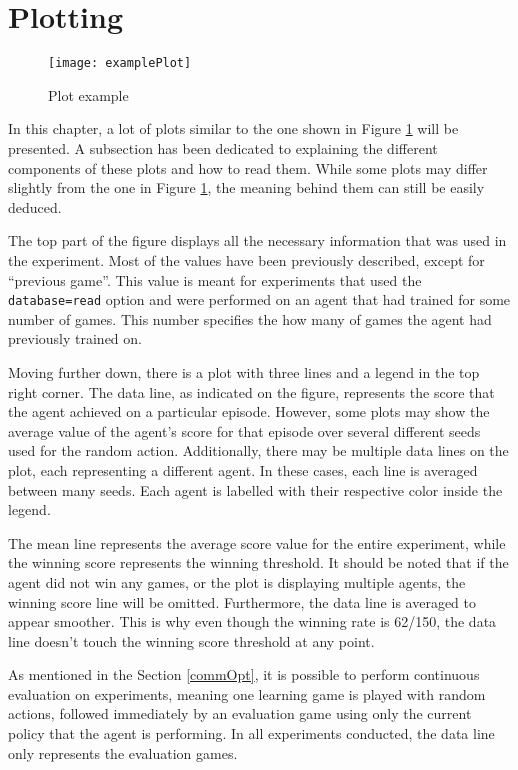 \section{Plotting}

\begin{figure}[h]
    \centering
    \texttt{[image: examplePlot]}
    \caption{Plot example}
    \label{fig:plt_eg}
\end{figure}

In this chapter, a lot of plots similar to the one shown in Figure \ref{fig:plt_eg} will be presented. A subsection has been dedicated to explaining the different components of these plots and how to read them. While some plots may differ slightly from the one in Figure \ref{fig:plt_eg}, the meaning behind them can still be easily deduced.

The top part of the figure displays all the necessary information that was used in the experiment. Most of the values have been previously described, except for ``previous game''. This value is meant for experiments that used the \texttt{database=read} option and were performed on an agent that had trained for some number of games. This number specifies the how many of games the agent had previously trained on.

Moving further down, there is a plot with three lines and a legend in the top right corner. The data line, as indicated on the figure, represents the score that the agent achieved on a particular episode. However, some plots may show the average value of the agent's score for that episode over several different seeds used for the random action. Additionally, there may be multiple data lines on the plot, each representing a different agent. In these cases, each line is averaged between many seeds. Each agent is labelled with their respective color inside the legend.

The mean line represents the average score value for the entire experiment, while the winning score represents the winning threshold. It should be noted that if the agent did not win any games, or the plot is displaying multiple agents, the winning score line will be omitted. Furthermore, the data line is averaged to appear smoother. This is why even though the winning rate is 62/150, the data line doesn't touch the winning score threshold at any point.

As mentioned in the Section \ref{commOpt}, it is possible to perform continuous evaluation on experiments, meaning one learning game is played with random actions, followed immediately by an evaluation game using only the current policy that the agent is performing. In all experiments conducted, the data line only represents the evaluation games.

